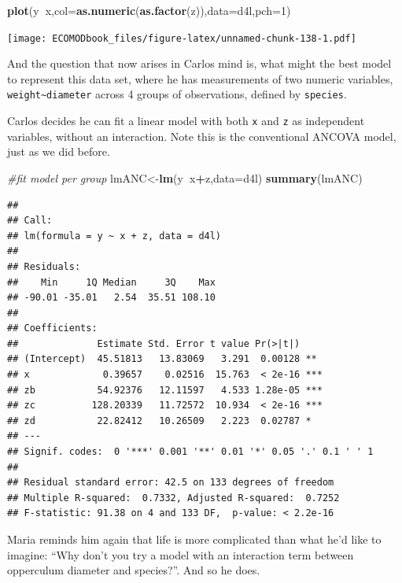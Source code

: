 \documentclass[
]{book}
\newenvironment{Shaded}{\begin{snugshade}}{\end{snugshade}}
\newcommand{\CommentTok}[1]{\textcolor[rgb]{0.56,0.35,0.01}{\textit{#1}}}
\newcommand{\DataTypeTok}[1]{\textcolor[rgb]{0.13,0.29,0.53}{#1}}
\newcommand{\DecValTok}[1]{\textcolor[rgb]{0.00,0.00,0.81}{#1}}
\newcommand{\KeywordTok}[1]{\textcolor[rgb]{0.13,0.29,0.53}{\textbf{#1}}}
\newcommand{\NormalTok}[1]{#1}
\newcommand{\OperatorTok}[1]{\textcolor[rgb]{0.81,0.36,0.00}{\textbf{#1}}}
\begin{document}
\begin{Shaded}
\begin{Highlighting}[]
\KeywordTok{plot}\NormalTok{(y}\OperatorTok{~}\NormalTok{x,}\DataTypeTok{col=}\KeywordTok{as.numeric}\NormalTok{(}\KeywordTok{as.factor}\NormalTok{(z)),}\DataTypeTok{data=}\NormalTok{d4l,}\DataTypeTok{pch=}\DecValTok{1}\NormalTok{)}
\end{Highlighting}
\end{Shaded}

\texttt{[image: ECOMODbook\_files/figure-latex/unnamed-chunk-138-1.pdf]}

And the question that now arises in Carlos mind is, what might the best model to represent this data set, where he has measurements of two numeric variables, \texttt{weight\textasciitilde{}diameter} across 4 groups of observations, defined by \texttt{species}.

Carlos decides he can fit a linear model with both \texttt{x} and \texttt{z} as independent variables, without an interaction. Note this is the conventional ANCOVA model, just as we did before.

\begin{Shaded}
\begin{Highlighting}[]
\CommentTok{#fit model per group}
\NormalTok{lmANC<-}\KeywordTok{lm}\NormalTok{(y}\OperatorTok{~}\NormalTok{x}\OperatorTok{+}\NormalTok{z,}\DataTypeTok{data=}\NormalTok{d4l)}
\KeywordTok{summary}\NormalTok{(lmANC)}
\end{Highlighting}
\end{Shaded}

\begin{verbatim}
## 
## Call:
## lm(formula = y ~ x + z, data = d4l)
## 
## Residuals:
##    Min     1Q Median     3Q    Max 
## -90.01 -35.01   2.54  35.51 108.10 
## 
## Coefficients:
##              Estimate Std. Error t value Pr(>|t|)    
## (Intercept)  45.51813   13.83069   3.291  0.00128 ** 
## x             0.39657    0.02516  15.763  < 2e-16 ***
## zb           54.92376   12.11597   4.533 1.28e-05 ***
## zc          128.20339   11.72572  10.934  < 2e-16 ***
## zd           22.82412   10.26509   2.223  0.02787 *  
## ---
## Signif. codes:  0 '***' 0.001 '**' 0.01 '*' 0.05 '.' 0.1 ' ' 1
## 
## Residual standard error: 42.5 on 133 degrees of freedom
## Multiple R-squared:  0.7332,	Adjusted R-squared:  0.7252 
## F-statistic: 91.38 on 4 and 133 DF,  p-value: < 2.2e-16
\end{verbatim}

Maria reminds him again that life is more complicated than what he'd like to imagine: ``Why don't you try a model with an interaction term between opperculum diameter and species?''. And so he does.
\end{document}
